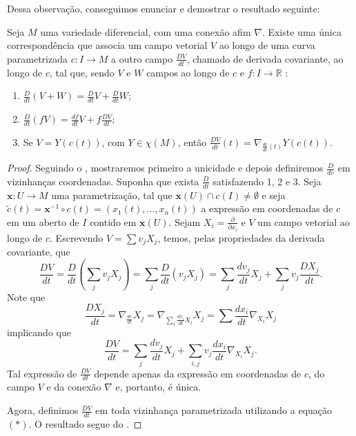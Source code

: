 Dessa observação, conseguimos enunciar e demostrar o resultado seguinte:
\begin{proposition}
    \label{loc:2.2_:_prop_1_:_derivada_covariante}
    Seja $M$ uma variedade diferencial, com uma conexão afim $\nabla$. Existe uma única correspondência que associa um campo vetorial $V$ ao longo de uma curva parametrizada $c:I\to M$ a outro campo $\frac{DV}{dt}$, chamado de derivada covariante, ao longo de $c$, tal que, sendo $V$ e $W$ campos ao longo de $c$ e $f:I\to \mathbb{R}$ :
    \begin{enumerate}
        \item $\frac{D}{dt}(V+W)= \frac{D}{dt}V +\frac{D}{dt}W$;
        \item $\frac{D}{dt}(fV)=\frac{df}{dt}V+f\frac{DV}{dt}$;
        \item Se $V = Y(c(t))$, com $Y \in \chi(M)$, então $\frac{DV}{dt}(t)=\nabla_{\frac{dc}{dt}(t)}Y(c(t))$.
    \end{enumerate}
    \begin{proof}

        Seguindo o , mostraremos primeiro a unicidade e depois definiremos $\frac{D}{dv}$ em vizinhanças coordenadas.
        Suponha que exista $\frac{D}{dt}$ satisfazendo 1, 2 e 3. Seja $\mathbf{x}:U\to M$ uma parametrização, tal que $\mathbf{x}(U)\cap c(I)\neq \emptyset$ e seja $\tilde{c}(t)=\mathbf{x}^{-1} \circ c(t)=(x_{1}(t), \dots, x_{n}(t))$ a expressão em coordenadas de $c$ em um aberto de $I$ contido em $\mathbf{x}(U)$.
        Sejam $X_{i}=\frac{\partial}{\partial x_{i}}$ e $V$ um campo vetorial ao longo de $c$.
        Escrevendo $V=\sum v_{j}X_{j}$, temos, pelas propriedades da derivada covariante, que
        \begin{equation*}
            \frac{DV}{dt}=\frac{D}{dt}\left( \sum_{j}v_{j}X_{j} \right)=\sum_{j}\frac{D}{dt}(v_{j}X_{j})=\sum_{j}\frac{dv_{j}}{dt}X_{j}+ \sum_{j}v_{j}\frac{DX_{j}}{dt}.
        \end{equation*}
        Note que
        \begin{equation*}
            \frac{DX_{j}}{dt}=\nabla_{\frac{dc}{dt}}X_{j}=\nabla_{\sum_{i}\frac{dx_{i}}{dt}X_{i}}X_{j}=\sum\frac{dx_{i}}{dt}\nabla_{X_{i}}X_{j}
        \end{equation*}
        implicando que
        \begin{equation*}
            \frac{DV}{dt}=\sum_{j}\frac{dv_{j}}{dt}X_{j}+\sum_{i,j}v_{j}\frac{dx_{i}}{dt}\nabla_{X_{i}}X_{j} \tag{*}.
        \end{equation*}
        Tal expressão de $\frac{DV}{dt}$ depende apenas da expressão em coordenadas de $c$, do campo $V$ e da conexão $\nabla$ e, portanto, é única.

        Agora, definimos $\frac{DV}{dt}$ em toda vizinhança parametrizada utilizando a equação $(*)$. O resultado segue do .
    \end{proof}
\end{proposition}
